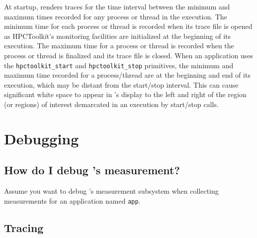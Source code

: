 \documentclass[11pt,twoside,letterpaper]{report}
\begin{document}
At startup, \hpctraceviewer{}  renders traces for the time interval between the minimum and maximum times recorded for any process or thread in the execution. The minimum time for each process or thread is recorded when its trace file is opened as HPCToolkit's monitoring facilities are initialized at the beginning of its execution. The maximum time for a process or thread is recorded when the process or thread is finalized and its trace file is closed. When an application uses the \verb|hpctoolkit_start| and \verb|hpctoolkit_stop| primitives, the minimum and maximum time recorded for a process/thread are  at the beginning and end of its execution, which may be  distant from the start/stop interval. This can cause significant white space to appear in \hpctraceviewer{}'s display to the left and right of the region (or regions) of interest demarcated in an execution by start/stop calls.

\section{Debugging}

\subsection{How do I debug \HPCToolkit{}'s measurement?}

Assume you want to debug \HPCToolkit{}'s measurement subsystem when
collecting measurements for an application named \texttt{app}.


\subsection{Tracing \libmonitor{}}
\end{document}
